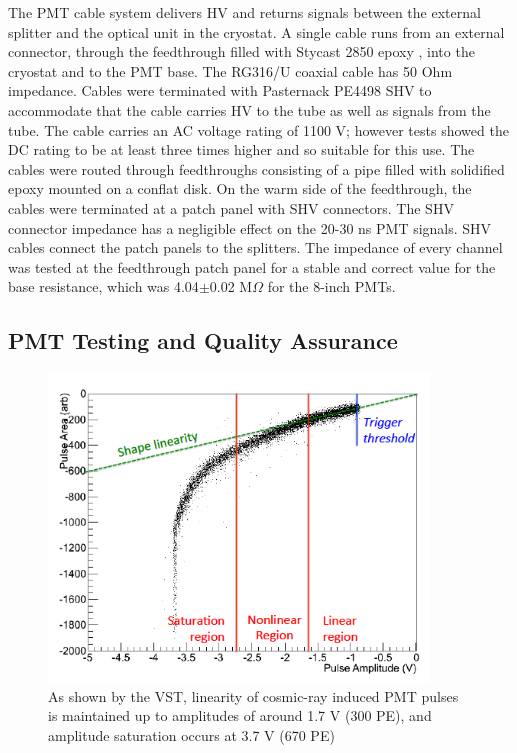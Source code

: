 The PMT cable system delivers HV and returns signals between the external splitter and the optical unit in the cryostat.   A single cable runs from an external connector, through the feedthrough filled with Stycast 2850 epoxy \cite{stycast}, into the cryostat and to the PMT base. The RG316/U coaxial cable has 50 Ohm impedance.  Cables were terminated with Pasternack PE4498 SHV to accommodate that the cable carries HV to the tube as well as signals from the tube.
The cable carries an AC voltage rating of 1100 V; however tests showed the DC rating to be at least three times higher and so suitable for this use.  The cables were routed through feedthroughs consisting of a pipe filled with solidified epoxy mounted on a conflat disk.  On the warm side of the feedthrough, the cables were terminated at a patch panel with SHV connectors. The SHV connector impedance has a negligible effect on the 20-30 ns PMT signals.  SHV cables connect the patch panels to the splitters.  The impedance of every channel was tested at the feedthrough patch panel for a stable and correct value for the base resistance, which was 4.04$\pm$0.02 M$\Omega$ for the 8-inch PMTs. 

\subsection{PMT Testing and Quality Assurance}

\begin{figure}[t]
\centering 
\includegraphics[width=0.9\textwidth]{./light_figures/nonlinear.png}
\caption{\footnotesize As shown by the VST, linearity of cosmic-ray induced PMT pulses is maintained up to amplitudes of around 1.7 V (300 PE), and amplitude saturation occurs at 3.7 V (670 PE) \cite{Jones:2015bya}
 \label{fig:nonlinear}  }
\end{figure}

